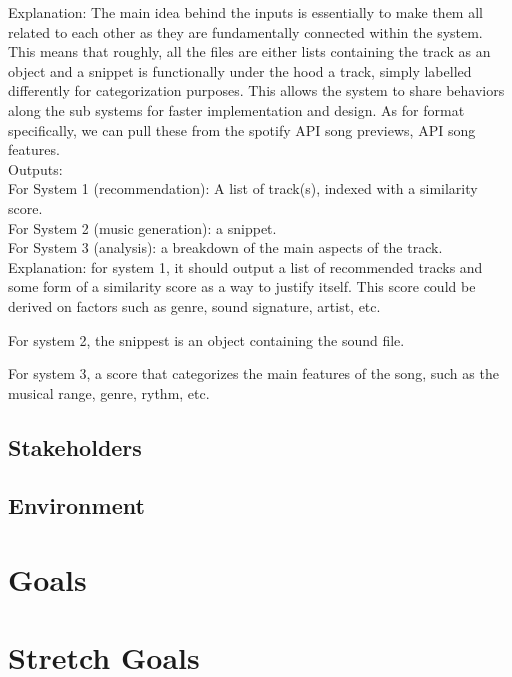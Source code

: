 \documentclass{article}
\begin{document}
Explanation: The main idea behind the inputs is essentially to make them all related to each other as they are
fundamentally connected within the system. This means that roughly, all the files are either lists containing
the track as an object and a snippet is functionally under the hood a track, simply labelled differently for
categorization purposes. This allows the system to share behaviors along the sub systems for 
faster implementation and design. As for format specifically, we can pull these from the spotify API song previews,
API song features. \\

Outputs: \\
For System 1 (recommendation): A list of track(s), indexed with a similarity score. \\
For System 2 (music generation): a snippet. \\
For System 3 (analysis): a breakdown of the main aspects of the track.\\

Explanation: for system 1, it should output a list of recommended tracks and some form of a similarity score
as a way to justify itself. This score could be derived on factors such as genre, sound signature, artist, etc.

For system 2, the snippest is an object containing the sound file. 

For system 3, a score that categorizes the main features of the song, such as the musical range, genre, rythm, etc. \\

\subsection{Stakeholders}

\subsection{Environment}


\section{Goals}

\section{Stretch Goals}
\end{document}
